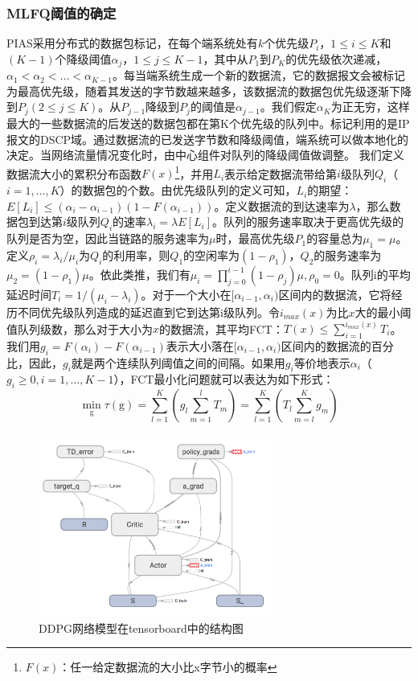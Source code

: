 \subsubsection{MLFQ阈值的确定}

PIAS采用分布式的数据包标记，在每个端系统处有$k$个优先级$P_i$，$1 \leq i \leq K$和$(K-1)$个降级阈值$\alpha_j$，$1 \leq j \leq K-1$，其中从$P_1$到$P_K$的优先级依次递减，$\alpha_1 < \alpha_2 < … < \alpha_{K-1}$。每当端系统生成一个新的数据流，它的数据报文会被标记为最高优先级，随着其发送的字节数越来越多，该数据流的数据包优先级逐渐下降到$P_j (2 \leq j \leq K)$。从$P_{j-1}$降级到$P_j$的阈值是$\alpha_{j-1}$。我们假定$\alpha_K$为正无穷，这样最大的一些数据流的后发送的数据包都在第K个优先级的队列中。标记利用的是IP报文的DSCP域。通过数据流的已发送字节数和降级阈值，端系统可以做本地化的决定。当网络流量情况变化时，由中心组件对队列的降级阈值做调整。
我们定义数据流大小的累积分布函数$F(x)$\footnote{$F(x)$：任一给定数据流的大小比x字节小的概率}，并用$L_i$表示给定数据流带给第$i$级队列$Q_i$（$i = 1, ..., K$）的数据包的个数。由优先级队列的定义可知，$L_i$的期望：$E[L_i] \leq (\alpha_i - \alpha_{i-1})(1-F(\alpha_{i-1}))$。定义数据流的到达速率为$\lambda$，那么数据包到达第$i$级队列$Q_i$的速率$\lambda_i = \lambda E[L_i]$。队列的服务速率取决于更高优先级的队列是否为空，因此当链路的服务速率为$\mu$时，最高优先级$P_1$的容量总为$\mu_1 = \mu$。定义$\rho_i = \lambda_i / \mu_i$为$Q_i$的利用率，则$Q_1$的空闲率为$(1-\rho_1)$，$Q_2$的服务速率为$\mu_2 = (1-\rho_1)\mu$。依此类推，我们有$\mu_i = \prod_{j=0}^{i-1} (1-\rho_j) \mu, \rho_0 = 0$。队列i的平均延迟时间$T_i = 1/(\mu_i - \lambda_i)$。对于一个大小在$[\alpha_{i-1},\alpha_i)$区间内的数据流，它将经历不同优先级队列造成的延迟直到它到达第i级队列。令$i_{max}(x)$为比$x$大的最小阈值队列级数，那么对于大小为$x$的数据流，其平均FCT：$T(x) \leq \sum_{i=1}^{i_{max}(x)}T_i$。我们用$g_i = F(\alpha_i)-F(\alpha_{i-1})$表示大小落在$[\alpha_{i-1},\alpha_i)$区间内的数据流的百分比，因此，$g_i$就是两个连续队列阈值之间的间隔。如果用$g_i$等价地表示$\alpha_i$（$g_i \geq 0, i = 1, ..., K-1$），FCT最小化问题就可以表达为如下形式：
\begin{equation}
\label{eq:target}
    \min_{\text{g}} \tau(\text{g}) = \sum_{l=1}^{K}(g_l \sum_{m=1}^{l}T_m) = \sum_{l=1}^K(T_l \sum_{m=l}^K g_m) 
\end{equation}
\begin{figure}[ht]
\centering
\includegraphics[height=6cm]{figure/DDPG.png}
\caption{DDPG网络模型在tensorboard中的结构图}
\label{fig:ddpg_tensor}
\end{figure}
